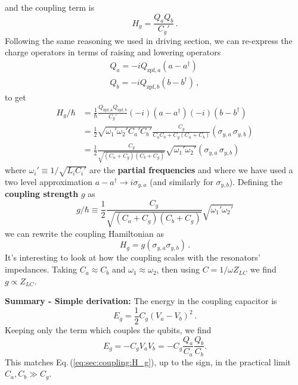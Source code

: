 and the coupling term is
\begin{equation}
  H_g = \frac{ Q_a Q_b} {C_g'} \, . \label{eq:sec:coupling:H_g}
\end{equation}
Following the same reasoning we used in driving section, we can re-express the charge operators in terms of raising and lowering operators
\begin{align}
  Q_a = -i Q_{\text{zpf}, a} (a - a^{\dagger}) \nonumber \\
  Q_b = -i Q_{\text{zpf}, b} (b - b^{\dagger}) \nonumber \, ,
\end{align}
to get
\begin{align*}
  H_g / \hbar
  &= \frac{1}{\hbar} \frac{Q_{\text{zpf},a}Q_{\text{zpf},b}}{C_g'}
    (-i)(a - a^\dagger) (-i)(b - b^\dagger) \\
  &= \frac{1}{2} \sqrt{\omega_1' \omega_2' C_a' C_b'}
    \frac{C_g}{C_a C_b + C_g(C_a + C_b)} (\sigma_{y,a} \, \sigma_{y,b}) \\
  &= \frac{1}{2}\frac{C_g}{\sqrt{(C_a + C_g) (C_b + C_g)}}
    \sqrt{\omega_1' \omega_2'} (\sigma_{y,a} \, \sigma_{y,b})
\end{align*}
where $\omega_i' \equiv 1 / \sqrt{L_i C_i'}$ are the \textbf{partial frequencies} and where we have used a two level approximation \mbox{$a - a^\dagger \rightarrow i \sigma_{y,a}$} (and similarly for $\sigma_{y, b}$).
Defining the \textbf{coupling strength} $g$ as
\begin{equation}
  g/\hbar \equiv \frac{1}{2} \frac{C_g}{\sqrt{(C_a + C_g) (C_b + C_g)}} \sqrt{\omega_1' \omega_2'}
\end{equation}
we can rewrite the coupling Hamiltonian as
\begin{equation*}
  H_g = g \left( \sigma_{y,a} \sigma_{y,b} \right) \, .
\end{equation*}
It's interesting to look at how the coupling scales with the resonators' impedances.
Taking $C_a \approx C_b$ and $\omega_1 \approx \omega_2$, then using $C = 1 / \omega Z_{LC}$ we find $g \propto Z_{LC}$.

\textbf{Summary - Simple derivation:} The energy in the coupling capacitor is
\begin{equation*}
  E_g = \frac{1}{2} C_g \left( V_a - V_b \right)^2 \, .
\end{equation*}
Keeping only the term which couples the qubits, we find
\begin{equation*}
  E_g = -C_g V_a V_b = -C_g \frac{Q_a}{C_a} \frac{Q_b}{C_b} .
\end{equation*}
This matches Eq.\,(\ref{eq:sec:coupling:H_g}), up to the sign, in the practical limit $C_a,C_b \gg C_g$.

